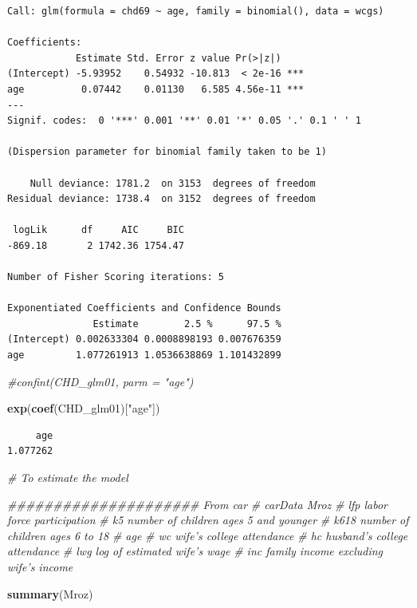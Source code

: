 \documentclass[
]{article}
\newenvironment{Shaded}{\begin{snugshade}}{\end{snugshade}}
\newcommand{\CommentTok}[1]{\textcolor[rgb]{0.56,0.35,0.01}{\textit{#1}}}
\newcommand{\KeywordTok}[1]{\textcolor[rgb]{0.13,0.29,0.53}{\textbf{#1}}}
\newcommand{\NormalTok}[1]{#1}
\newcommand{\StringTok}[1]{\textcolor[rgb]{0.31,0.60,0.02}{#1}}
\begin{document}
\begin{verbatim}
Call: glm(formula = chd69 ~ age, family = binomial(), data = wcgs)

Coefficients:
            Estimate Std. Error z value Pr(>|z|)    
(Intercept) -5.93952    0.54932 -10.813  < 2e-16 ***
age          0.07442    0.01130   6.585 4.56e-11 ***
---
Signif. codes:  0 '***' 0.001 '**' 0.01 '*' 0.05 '.' 0.1 ' ' 1

(Dispersion parameter for binomial family taken to be 1)

    Null deviance: 1781.2  on 3153  degrees of freedom
Residual deviance: 1738.4  on 3152  degrees of freedom

 logLik      df     AIC     BIC 
-869.18       2 1742.36 1754.47 

Number of Fisher Scoring iterations: 5

Exponentiated Coefficients and Confidence Bounds
               Estimate        2.5 %      97.5 %
(Intercept) 0.002633304 0.0008898193 0.007676359
age         1.077261913 1.0536638869 1.101432899
\end{verbatim}

\begin{Shaded}
\begin{Highlighting}[]
\CommentTok{#confint(CHD_glm01, parm = "age")}

\KeywordTok{exp}\NormalTok{(}\KeywordTok{coef}\NormalTok{(CHD_glm01)[}\StringTok{"age"}\NormalTok{])}
\end{Highlighting}
\end{Shaded}

\begin{verbatim}
     age 
1.077262 
\end{verbatim}

\begin{Shaded}
\begin{Highlighting}[]
\CommentTok{# To estimate the model}

\CommentTok{##################### From car}
\CommentTok{# carData Mroz}
\CommentTok{# lfp labor force participation}
\CommentTok{# k5 number of children ages 5 and younger}
\CommentTok{# k618 number of children ages 6 to 18}
\CommentTok{# age}
\CommentTok{# wc wife's college attendance}
\CommentTok{# hc husband's college attendance }
\CommentTok{# lwg log of estimated wife's wage}
\CommentTok{# inc family income excluding wife's income}

\KeywordTok{summary}\NormalTok{(Mroz)}
\end{Highlighting}
\end{Shaded}
\end{document}
